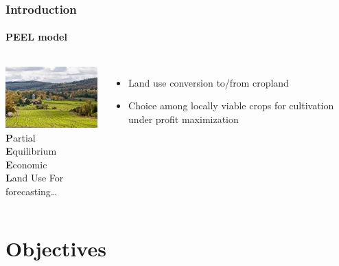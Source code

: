 \documentclass{beamer}
\begin{document}

\begin{frame}
  \frametitle{Introduction}
  \framesubtitle{PEEL model}
  \begin{columns}[c]
    \column{2.0in}
    \includegraphics[width=2.0in]{farm} \\
    \vspace{0.25in}
    \textbf{P}artial \\
    \textbf{E}quilibrium \\
    \textbf{E}conomic \\
    \textbf{L}and Use
    \column{2.5in}
    For forecasting\dots
    \pause
    \begin{itemize}
    \item 
      Land use conversion to\slash from cropland
      \pause
    \item 
      Choice among locally viable crops for cultivation under profit maximization
    \end{itemize}
  \end{columns}
\end{frame}


\section{Objectives}

\end{document}
